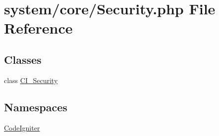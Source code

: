 \hypertarget{_security_8php}{}\section{system/core/\+Security.php File Reference}
\label{_security_8php}
\subsection*{Classes}
\begin{DoxyCompactItemize}
\item 
class \mbox{\hyperlink{class_c_i___security}{C\+I\+\_\+\+Security}}
\end{DoxyCompactItemize}
\subsection*{Namespaces}
\begin{DoxyCompactItemize}
\item 
 \mbox{\hyperlink{namespace_code_igniter}{Code\+Igniter}}
\end{DoxyCompactItemize}
